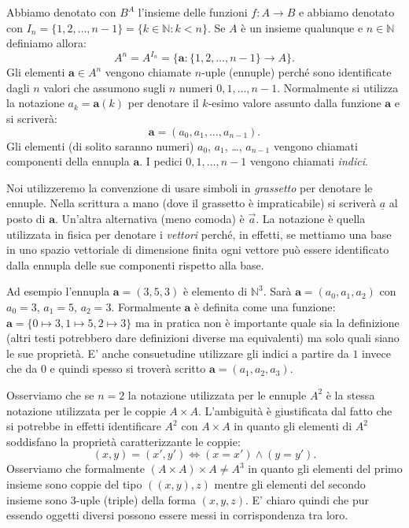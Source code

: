 \documentclass[italian,a4paper,hidelinks,headinclude]{scrartcl}
\newcommand{\NN}{{\mathbb N}}
\renewcommand{\vec}[1]{\boldsymbol{#1}}
\begin{document}
Abbiamo denotato con $B^A$ l'insieme delle funzioni $f\colon A \to B$ e
abbiamo denotato con $I_n = \{1, 2, \dots, n-1\} = \{k\in \NN \colon k<n\}$.
Se $A$ è un insieme qualunque e $n\in\NN$ definiamo allora:
\[
   A^n = A^{I_n} = \{\vec a\colon \{1, 2, \dots, n-1\}\to A\}.
\]
Gli elementi $\vec a \in A^n$ vengono chiamate $n$-uple (ennuple) perché
sono identificate dagli $n$ valori che assumono sugli $n$ numeri $0,1,\dots,n-1$.
Normalmente si utilizza la notazione $a_k = \vec a(k)$ per denotare
il $k$-esimo valore assunto dalla funzione $\vec a$ e si scriverà:
\[
  \vec a = (a_0, a_1, \dots, a_{n-1}).
\]
Gli elementi (di solito saranno numeri) $a_0$, $a_1$, \dots, $a_{n-1}$ vengono
chiamati componenti della ennupla $\vec a$. I pedici $0,1, \dots, n-1$ vengono
chiamati \emph{indici}.

Noi utilizzeremo la convenzione di usare simboli in \emph{grassetto} per denotare
le ennuple. Nella scrittura a mano (dove il grassetto è impraticabile)
si scriverà $\underline{a}$ al posto di $\vec a$. Un'altra alternativa (meno comoda)
è $\stackrel{\to}{a}$.
La notazione è quella utilizzata in fisica per denotare i \emph{vettori} perché,
in effetti, se mettiamo una base in uno spazio vettoriale di dimensione finita
ogni vettore può essere identificato dalla ennupla delle sue componenti rispetto
alla base.

Ad esempio l'ennupla $\vec a = (3,5,3)$ è elemento di $\NN^3$.
Sarà $\vec a = (a_0, a_1, a_2)$ con $a_0=3$, $a_1=5$, $a_2=3$.
Formalmente $\vec a$ è definita come una funzione:
$\vec a = \{0\mapsto 3, 1\mapsto 5, 2 \mapsto 3\}$ ma in pratica non è importante
quale sia la definizione (altri testi potrebbero dare definizioni diverse ma equivalenti)
ma solo quali siano le sue proprietà.
E' anche consuetudine utilizzare gli indici a partire da $1$ invece che da $0$
e quindi spesso si troverà scritto $\vec a = (a_1, a_2, a_3)$.

Osserviamo che se $n=2$ la notazione utilizzata per le ennuple $A^2$ è la stessa
notazione utilizzata per le coppie $A\times A$.
L'ambiguità è giustificata dal fatto che si potrebbe in effetti identificare
$A^2$ con $A\times A$ in quanto gli elementi di $A^2$ soddisfano la proprietà
caratterizzante le coppie:
\[
  (x,y) = (x',y') \iff (x=x') \land (y=y').
\]
Osserviamo che formalmente $(A\times A)\times A \neq A^3$ in quanto gli elementi
del primo insieme sono coppie del tipo $((x,y),z)$ mentre gli elementi
del secondo insieme sono $3$-uple (triple) della forma $(x,y,z)$.
E' chiaro quindi che pur essendo oggetti diversi possono essere messi
in corrispondenza tra loro.
\end{document}
